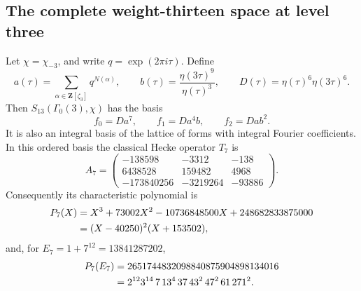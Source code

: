 \subsection{The complete weight-thirteen space at level three}
\label{sec:gl2-weight13}

\begin{proposition}[K17-GL2-MODEL]\label{prop:gl2-weight13}
Let $\chi=\chi_{-3}$, and write $q=\exp(2\pi i\tau)$. Define
\[
 a(\tau)=\sum_{\alpha\in\mathbf Z[\zeta_3]}q^{N(\alpha)},\qquad
 b(\tau)=\frac{\eta(3\tau)^9}{\eta(\tau)^3},\qquad
 D(\tau)=\eta(\tau)^6\eta(3\tau)^6.
\]
Then $S_{13}(\Gamma_0(3),\chi)$ has the basis
\[
 f_0=Da^7,\qquad f_1=Da^4b,\qquad f_2=Dab^2.
\]
It is also an integral basis of the lattice of forms with integral Fourier
coefficients. In this ordered basis the classical Hecke operator $T_7$ is
\[
 A_7=
 \begin{pmatrix}
 -138598&-3312&-138\\
 6438528&159482&4968\\
 -173840256&-3219264&-93886
 \end{pmatrix}.
\]
Consequently its characteristic polynomial is
\begin{align}
 P_7(X)
 &=X^3+73002X^2-10736848500X+248682833875000 \notag\\
 &=(X-40250)^2(X+153502), \label{eq:gl2-p7}
\end{align}
and, for $E_7=1+7^{12}=13841287202$,
\begin{align}
 P_7(E_7)
 &=2651744832098840875904898134016 \notag\\
 &=2^{12}3^{14}\,7\,13^4\,37\,43^2\,47^2\,61\,271^2.
 \label{eq:gl2-p7-evaluation}
\end{align}
\end{proposition}

